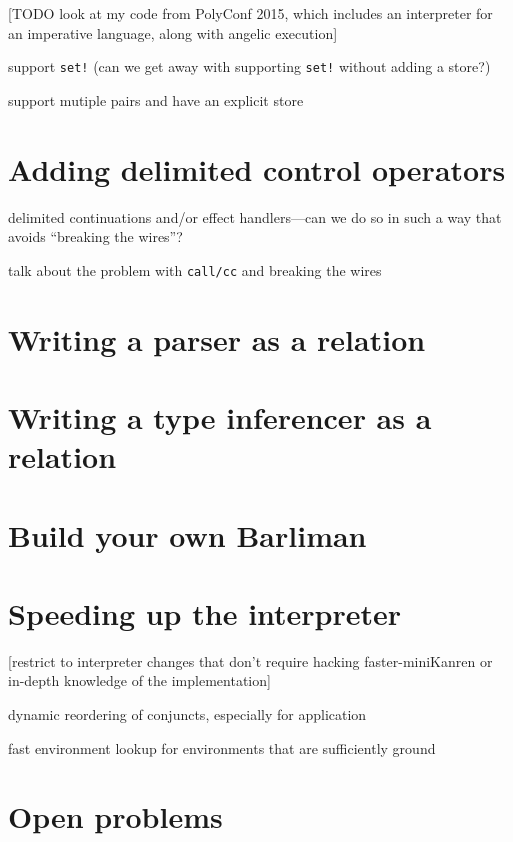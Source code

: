 \documentclass{book}
\begin{document}
[TODO look at my code from PolyConf 2015, which includes an interpreter for an imperative language, along with angelic execution]

support \verb|set!| (can we get away with supporting \verb|set!| without adding a store?)

support mutiple pairs and have an explicit store


\chapter{Adding delimited control operators}%

delimited continuations and/or effect handlers---can we do so in such a way that avoids ``breaking the wires''?

talk about the problem with \verb|call/cc| and breaking the wires



\chapter{Writing a parser as a relation}%


\chapter{Writing a type inferencer as a relation}%


\chapter{Build your own Barliman}%


\chapter{Speeding up the interpreter}%

[restrict to interpreter changes that don't require hacking faster-miniKanren or in-depth knowledge of the implementation]

dynamic reordering of conjuncts, especially for application

fast environment lookup for environments that are sufficiently ground


\chapter{Open problems}%


\appendix
\end{document}

